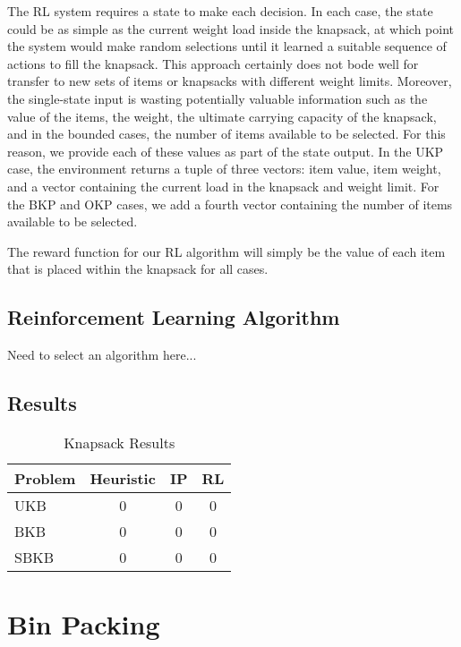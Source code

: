 \documentclass[12pt]{article}
\newcommand{\ra}[1]{\renewcommand{\arraystretch}{#1}}
\begin{document}
The RL system requires a state to make each decision.
In each case, the state could be as simple as the current weight load inside the knapsack, at which point the system would make random selections until it learned a suitable sequence of actions to fill the knapsack.
This approach certainly does not bode well for transfer to new sets of items or knapsacks with different weight limits.
Moreover, the single-state input is wasting potentially valuable information such as the value of the items, the weight, the ultimate carrying capacity of the knapsack, and in the bounded cases, the number of items available to be selected.
For this reason, we provide each of these values as part of the state output.
In the UKP case, the environment returns a tuple of three vectors: item value, item weight, and a vector containing the current load in the knapsack and weight limit.
For the BKP and OKP cases, we add a fourth vector containing the number of items available to be selected.

The reward function for our RL algorithm will simply be the value of each item that is placed within the knapsack for all cases.

\subsection{Reinforcement Learning Algorithm}

Need to select an algorithm here...

\subsection{Results}

\begin{table}
\centering
\caption{Knapsack Results}
\ra{1.3}
\begin{tabular}{@{}lccc@{}}\toprule
Problem & Heuristic & IP & RL \\
\midrule
UKB & 0 & 0 & 0 \\
BKB & 0 & 0 & 0 \\
SBKB & 0 & 0 & 0 \\
\bottomrule
\end{tabular}
\label{tab:kp_results}
\end{table}


\section{Bin Packing}
\end{document}

